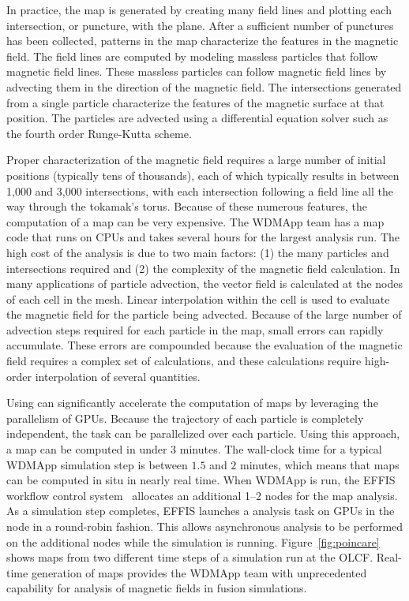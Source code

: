In practice, the \poincare map is generated by creating many field lines and plotting each intersection, or puncture, with the plane.
After a sufficient number of punctures has been collected, patterns in the map characterize the features in the magnetic field.
The field lines are computed by modeling massless particles that follow magnetic field lines.
These massless particles can follow magnetic field lines by advecting them in the direction of the magnetic field.
The intersections generated from a single particle characterize the features of the magnetic surface at that position.
The particles are advected using a differential equation solver such as the fourth order Runge-Kutta scheme.

Proper characterization of the magnetic field requires a large number of initial positions (typically tens of thousands), each of which typically results in between 1,000 and 3,000 intersections, with each intersection following a field line all the way through the tokamak's torus.
Because of these numerous features, the computation of a \poincare map can be very expensive.
The WDMApp team has a \poincare map code that runs on CPUs and takes several hours for the largest analysis run. 
The high cost of the analysis is due to two main factors: (1) the many particles and intersections required and (2) the complexity of the magnetic field calculation.  In many applications of particle advection, the vector field is calculated at the nodes of each cell in the mesh. Linear interpolation within the cell is used to evaluate the magnetic field for the particle being advected. Because of the large number of advection steps required for each particle in the \poincare map, small errors can rapidly accumulate. These errors are compounded because the evaluation of the magnetic field requires a complex set of calculations, and these calculations require high-order interpolation of several quantities.

Using \vtkm can significantly accelerate the computation of \poincare maps by leveraging the parallelism of GPUs. Because the trajectory of each particle is completely independent, the task can be parallelized over each particle. Using this approach, a \poincare map can be computed in under $3$ minutes. The wall-clock time for a typical WDMApp simulation step is between $1.5$ and $2$ minutes, which means that \poincare maps can be computed in situ in nearly real time.
When WDMApp is run, the EFFIS workflow control system~\citep{Suchyta2022:effis} allocates an additional 1--2 nodes for the \poincare map analysis. As a simulation step completes, EFFIS launches a \poincare analysis task on GPUs in the node in a round-robin fashion. This allows asynchronous analysis to be performed on the additional nodes while the simulation is running. Figure~\ref{fig:poincare} shows \poincare maps from two different time steps of a simulation run at the OLCF.
Real-time generation of \poincare maps provides the WDMApp team with unprecedented capability for analysis of magnetic fields in fusion simulations.



